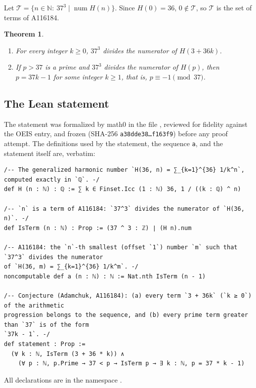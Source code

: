 \documentclass[11pt]{amsart}
\theoremstyle{plain}
\newtheorem{theorem}{Theorem}
\theoremstyle{definition}
\newcommand{\code}[1]{\texttt{#1}}
\newcommand{\N}{\mathbb{N}}
\newcommand{\Term}{\mathcal{T}}
\DeclareMathOperator{\num}{num}
\begin{document}
Let $\Term=\{n\in\N:\ 37^3\mid\num H(n)\}$. Since $H(0)=36$, $0\notin\Term$, so $\Term$ is the set of terms of A116184.

\begin{theorem}\label{thm:main}
\leavevmode
\begin{enumerate}
\item[(a)] For every integer $k\ge0$, $37^3$ divides the numerator of $H(3+36k)$.
\item[(b)] If $p>37$ is a prime and $37^3$ divides the numerator of $H(p)$, then $p=37k-1$ for some integer $k\ge1$, that is, $p\equiv-1\pmod{37}$.
\end{enumerate}
\end{theorem}

\subsection*{The Lean statement}
The statement was formalized by math0 in the file , reviewed for fidelity against the OEIS entry, and frozen (SHA-256 \texttt{a38dde38\ldots f163f9}) before any proof attempt. The definitions used by the statement, the sequence \code{a}, and the statement itself are, verbatim:
\begin{lstlisting}
/-- The generalized harmonic number `H(36, n) = ∑_{k=1}^{36} 1/k^n`, computed exactly in `ℚ`. -/
def H (n : ℕ) : ℚ := ∑ k ∈ Finset.Icc (1 : ℕ) 36, 1 / ((k : ℚ) ^ n)

/-- `n` is a term of A116184: `37^3` divides the numerator of `H(36, n)`. -/
def IsTerm (n : ℕ) : Prop := (37 ^ 3 : ℤ) ∣ (H n).num

/-- A116184: the `n`-th smallest (offset `1`) number `m` such that `37^3` divides the numerator
of `H(36, m) = ∑_{k=1}^{36} 1/k^m`. -/
noncomputable def a (n : ℕ) : ℕ := Nat.nth IsTerm (n - 1)

/-- Conjecture (Adamchuk, A116184): (a) every term `3 + 36k` (`k ≥ 0`) of the arithmetic
progression belongs to the sequence, and (b) every prime term greater than `37` is of the form
`37k - 1`. -/
def statement : Prop :=
  (∀ k : ℕ, IsTerm (3 + 36 * k)) ∧
    (∀ p : ℕ, p.Prime → 37 < p → IsTerm p → ∃ k : ℕ, p = 37 * k - 1)
\end{lstlisting}
All declarations are in the namespace .
\end{document}

